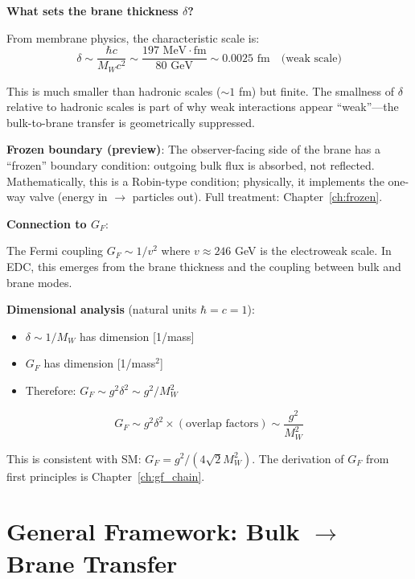 \textbf{What sets the brane thickness $\delta$?}

From membrane physics, the characteristic scale is:
\begin{equation}
\delta \sim \frac{\hbar c}{M_W c^2} \sim \frac{197 \text{ MeV}\cdot\text{fm}}{80 \text{ GeV}}
\sim 0.0025 \text{ fm} \quad \text{(weak scale)}
\end{equation}

This is much smaller than hadronic scales ($\sim 1$ fm) but finite. The smallness
of $\delta$ relative to hadronic scales is part of why weak interactions appear
``weak''---the bulk-to-brane transfer is geometrically suppressed.

\textbf{Frozen boundary (preview)}:
The observer-facing side of the brane has a ``frozen'' boundary condition:
outgoing bulk flux is absorbed, not reflected. Mathematically, this is a
Robin-type condition; physically, it implements the one-way valve
(energy in $\to$ particles out). Full treatment: Chapter~\ref{ch:frozen}.

\textbf{Connection to $G_F$}:

The Fermi coupling $G_F \sim 1/v^2$ where $v \approx 246$ GeV is the electroweak
scale. In EDC, this emerges from the brane thickness and the coupling between
bulk and brane modes.

\textbf{Dimensional analysis} (natural units $\hbar = c = 1$):
\begin{itemize}[nosep]
\item $\delta \sim 1/M_W$ has dimension [1/mass]
\item $G_F$ has dimension [1/mass$^2$]
\item Therefore: $G_F \sim g^2 \delta^2 \sim g^2/M_W^2$ \tagI{}
\end{itemize}

\begin{equation}
G_F \sim g^2 \delta^2 \times (\text{overlap factors}) \sim \frac{g^2}{M_W^2}
\end{equation}

This is consistent with SM: $G_F = g^2/(4\sqrt{2} M_W^2)$.
The derivation of $G_F$ from first principles is Chapter~\ref{ch:gf_chain}.

\section{General Framework: Bulk $\to$ Brane Transfer}
\label{sec:general_framework}

